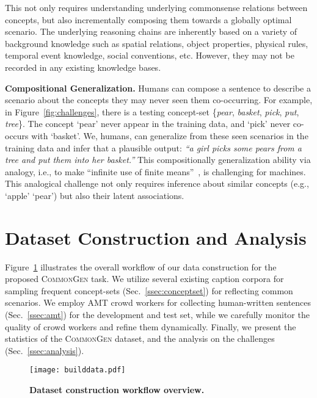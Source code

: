 \documentclass[11pt,a4paper]{article}
\begin{document}
	This not only requires understanding underlying commonsense relations between concepts, 
	but also incrementally composing them towards a globally optimal scenario.
	The underlying reasoning chains are  
	inherently based on a variety of background knowledge such as spatial relations,  object properties, physical rules, temporal event knowledge, social conventions, etc. 
	However, they may not be recorded in any existing knowledge bases.




	
	\smallskip
	\noindent
	\textbf{Compositional Generalization.}
Humans can compose a sentence to describe a scenario about the concepts they may never seen them co-occurring.
	For example, in Figure~\ref{fig:challenges}, there is a testing concept-set \{\textit{pear}, \textit{basket}, \textit{pick}, \textit{put}, \textit{tree}\}.
	The concept `pear' never appear in the training data, and `pick' never co-occurs with `basket'. 
We, humans, can generalize from these seen scenarios in the training data and infer that a plausible output: \textit{``a girl picks some pears from a tree and put them into her basket.''} 
This compositionally generalization ability via analogy, i.e., to make ``infinite use of finite means''~\cite{chomsky1965aspects}, is challenging for machines.
This analogical challenge not only requires inference about similar concepts (e.g., `apple'  `pear') but also their latent associations.



	 	
	\section{Dataset Construction and Analysis}
	\label{sec:dataset}
Figure~\ref{fig:builddata}
illustrates the overall workflow of our data construction for the proposed \textsc{CommonGen} task.	
We utilize several existing caption corpora for sampling frequent concept-sets (Sec.~\ref{ssec:conceptset}) for reflecting common scenarios.
	We employ AMT crowd workers for collecting human-written sentences (Sec.~\ref{ssec:amt}) for the development and test set, while we carefully monitor the quality of crowd workers and refine them dynamically.
	Finally, we present the statistics of the \textsc{CommonGen} dataset, and the analysis on the challenges  (Sec.~\ref{ssec:analysis}).
	
	
\begin{figure}[t!]
		\centering
		\texttt{[image: builddata.pdf]}
		\caption{ \textbf{Dataset construction workflow overview.} 
		\vspace{-1em}
		}
		\label{fig:builddata}
	\end{figure}
\end{document}
